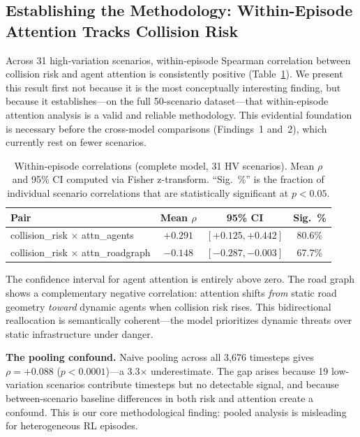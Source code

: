 \documentclass[10pt]{article} %
\begin{document}
\subsection{Establishing the Methodology: Within-Episode Attention Tracks Collision Risk}
\label{sec:methodology_validation}

Across 31 high-variation scenarios, within-episode Spearman correlation between collision risk and agent attention is consistently positive (Table~\ref{tab:correlations}). We present this result first not because it is the most conceptually interesting finding, but because it establishes---on the full 50-scenario dataset---that within-episode attention analysis is a valid and reliable methodology. This evidential foundation is necessary before the cross-model comparisons (Findings~1 and~2), which currently rest on fewer scenarios.

\begin{table}[ht]
    \caption{Within-episode correlations (complete model, 31 HV scenarios). Mean $\rho$ and 95\% CI computed via Fisher z-transform. ``Sig.\ \%'' is the fraction of individual scenario correlations that are statistically significant at $p < 0.05$.}
    \label{tab:correlations}
    \begin{center}
    \begin{tabular}{lccc}
        \toprule
        \textbf{Pair} & \textbf{Mean $\rho$} & \textbf{95\% CI} & \textbf{Sig.\ \%} \\
        \midrule
        collision\_risk $\times$ attn\_agents     & $+0.291$ & $[+0.125, +0.442]$ & 80.6\% \\
        collision\_risk $\times$ attn\_roadgraph  & $-0.148$ & $[-0.287, -0.003]$ & 67.7\% \\
        \bottomrule
    \end{tabular}
    \end{center}
\end{table}

The confidence interval for agent attention is entirely above zero. The road graph shows a complementary negative correlation: attention shifts \textit{from} static road geometry \textit{toward} dynamic agents when collision risk rises. This bidirectional reallocation is semantically coherent---the model prioritizes dynamic threats over static infrastructure under danger.

\textbf{The pooling confound.} Naive pooling across all 3,676 timesteps gives $\rho{=}+0.088$ ($p < 0.0001$)---a 3.3$\times$ underestimate. The gap arises because 19 low-variation scenarios contribute timesteps but no detectable signal, and because between-scenario baseline differences in both risk and attention create a confound. This is our core methodological finding: pooled analysis is misleading for heterogeneous RL episodes.
\end{document}

